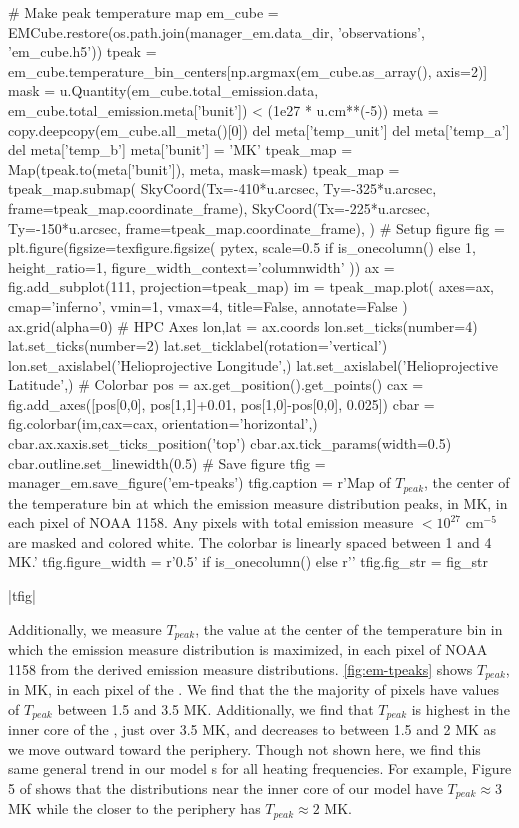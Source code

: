 \begin{pycode}[manager_em]
# Make peak temperature map
em_cube = EMCube.restore(os.path.join(manager_em.data_dir, 'observations', 'em_cube.h5'))
tpeak = em_cube.temperature_bin_centers[np.argmax(em_cube.as_array(), axis=2)]
mask = u.Quantity(em_cube.total_emission.data, em_cube.total_emission.meta['bunit']) < (1e27 * u.cm**(-5))
meta = copy.deepcopy(em_cube.all_meta()[0])
del meta['temp_unit']
del meta['temp_a']
del meta['temp_b']
meta['bunit'] = 'MK'
tpeak_map = Map(tpeak.to(meta['bunit']), meta, mask=mask)
tpeak_map = tpeak_map.submap(
    SkyCoord(Tx=-410*u.arcsec, Ty=-325*u.arcsec, frame=tpeak_map.coordinate_frame),
    SkyCoord(Tx=-225*u.arcsec, Ty=-150*u.arcsec, frame=tpeak_map.coordinate_frame),
)
# Setup figure
fig = plt.figure(figsize=texfigure.figsize(
    pytex,
    scale=0.5 if is_onecolumn() else 1,
    height_ratio=1,
    figure_width_context='columnwidth'
))
ax = fig.add_subplot(111, projection=tpeak_map)
im = tpeak_map.plot(
    axes=ax,
    cmap='inferno',
    vmin=1,
    vmax=4,
    title=False,
    annotate=False
)
ax.grid(alpha=0)
# HPC Axes
lon,lat = ax.coords
lon.set_ticks(number=4)
lat.set_ticks(number=2)
lat.set_ticklabel(rotation='vertical')
lon.set_axislabel('Helioprojective Longitude',)
lat.set_axislabel('Helioprojective Latitude',)
# Colorbar
pos = ax.get_position().get_points()
cax = fig.add_axes([pos[0,0], pos[1,1]+0.01, pos[1,0]-pos[0,0], 0.025])
cbar = fig.colorbar(im,cax=cax, orientation='horizontal',)
cbar.ax.xaxis.set_ticks_position('top')
cbar.ax.tick_params(width=0.5)
cbar.outline.set_linewidth(0.5)
# Save figure
tfig = manager_em.save_figure('em-tpeaks')
tfig.caption = r'Map of $T_{peak}$, the center of the temperature bin at which the emission measure distribution peaks, in MK, in each pixel of \AR{} NOAA 1158. Any pixels with total emission measure $<10^{27}$ cm$^{-5}$ are masked and colored white. The colorbar is linearly spaced between 1 and 4 MK.'
tfig.figure_width = r'0.5\columnwidth' if is_onecolumn() else r'\columnwidth'
tfig.fig_str = fig_str
\end{pycode}
\py[manager_em]|tfig|

Additionally, we measure $T_{peak}$, the value at the center of the temperature bin in which the emission measure distribution is maximized, in each pixel of \AR{} NOAA 1158 from the derived emission measure distributions.
\autoref{fig:em-tpeaks} shows $T_{peak}$, in MK, in each pixel of the \AR{}.
We find that the the majority of pixels have values of $T_{peak}$ between 1.5 and 3.5 MK.
Additionally, we find that $T_{peak}$ is highest in the inner core of the \AR{}, just over 3.5 MK, and decreases to between 1.5 and 2 MK as we move outward toward the periphery.
Though not shown here, we find this same general trend in our model \AR s for all heating frequencies.
For example, Figure 5 of  shows that the \dem{} distributions near the inner core of our model \AR{} have $T_{peak}\approx3$ MK while the \dem{} closer to the periphery has $T_{peak}\approx2$ MK.

